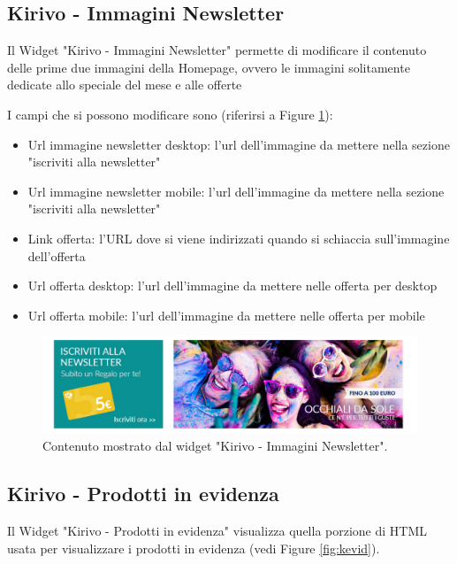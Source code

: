 
\newpage
\subsection{Kirivo - Immagini Newsletter}

Il Widget "Kirivo - Immagini Newsletter" permette di modificare il contenuto
delle prime due immagini della Homepage, ovvero le immagini solitamente dedicate
allo speciale del mese e alle offerte 

I campi che si possono modificare sono (riferirsi a Figure \ref{fig:knews}):
\begin{itemize}
\item Url immagine newsletter desktop: l'url dell'immagine da mettere nella sezione "iscriviti alla newsletter"
\item Url immagine newsletter mobile: l'url dell'immagine da mettere nella sezione "iscriviti alla newsletter"
\item Link offerta: l'URL dove si viene indirizzati quando si schiaccia sull'immagine dell'offerta
\item Url offerta desktop: l'url dell'immagine da mettere nelle offerta per desktop
\item Url offerta mobile: l'url dell'immagine da mettere nelle offerta per mobile
\end{itemize}

\begin{figure}
  \includegraphics[width=\textwidth]{figure/knews.png}
  \caption{Contenuto mostrato dal widget "Kirivo - Immagini Newsletter".}
  \label{fig:knews}
\end{figure}


\newpage
\subsection{Kirivo - Prodotti in evidenza}

Il Widget "Kirivo - Prodotti in evidenza" visualizza quella porzione di HTML usata
per visualizzare i prodotti in evidenza (vedi Figure \ref{fig:kevid}).

